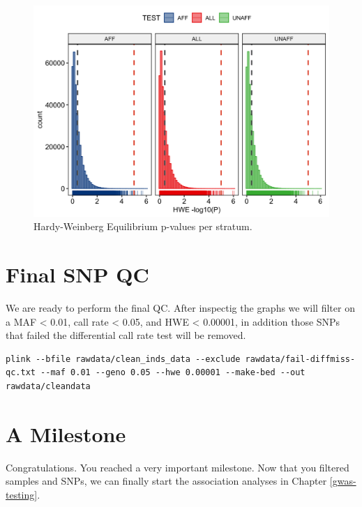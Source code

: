 \documentclass[
]{book}
\begin{document}
\begin{figure}

{\centering \includegraphics[width=18.67in]{img/show-hwe} 

}

\caption{Hardy-Weinberg Equilibrium p-values per stratum.}\label{fig:show-hwe}
\end{figure}

\hypertarget{final-snp-qc}{%
\section{Final SNP QC}\label{final-snp-qc}}

We are ready to perform the final QC. After inspectig the graphs we will filter on a MAF \textless{} 0.01, call rate \textless{} 0.05, and HWE \textless{} 0.00001, in addition those SNPs that failed the differential call rate test will be removed.

\begin{lstlisting}
plink --bfile rawdata/clean_inds_data --exclude rawdata/fail-diffmiss-qc.txt --maf 0.01 --geno 0.05 --hwe 0.00001 --make-bed --out rawdata/cleandata
\end{lstlisting}

\hypertarget{a-milestone}{%
\section{A Milestone}\label{a-milestone}}

Congratulations. You reached a very important milestone. Now that you filtered samples and SNPs, we can finally start the association analyses in Chapter \ref{gwas-testing}.
\end{document}
